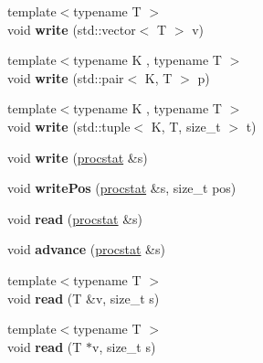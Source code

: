 \begin{DoxyCompactItemize}
{\footnotesize template$<$typename T $>$ }\\void {\bfseries write} (std\+::vector$<$ T $>$ v)
\item 
\hypertarget{classfaster_1_1fastCommBuffer_a0a3d8c055a7c060f5a16b03390fc4cf3}{}\label{classfaster_1_1fastCommBuffer_a0a3d8c055a7c060f5a16b03390fc4cf3} 
{\footnotesize template$<$typename K , typename T $>$ }\\void {\bfseries write} (std\+::pair$<$ K, T $>$ p)
\item 
\hypertarget{classfaster_1_1fastCommBuffer_ae09a68a8815aa1f7a24a5fab133c34ca}{}\label{classfaster_1_1fastCommBuffer_ae09a68a8815aa1f7a24a5fab133c34ca} 
{\footnotesize template$<$typename K , typename T $>$ }\\void {\bfseries write} (std\+::tuple$<$ K, T, size\+\_\+t $>$ t)
\item 
\hypertarget{classfaster_1_1fastCommBuffer_a96461d57713b8184137257c6e045c0a1}{}\label{classfaster_1_1fastCommBuffer_a96461d57713b8184137257c6e045c0a1} 
void {\bfseries write} (\hyperlink{classfaster_1_1procstat}{procstat} \&s)
\item 
\hypertarget{classfaster_1_1fastCommBuffer_a58ca907f93b412801d9cc956510a2356}{}\label{classfaster_1_1fastCommBuffer_a58ca907f93b412801d9cc956510a2356} 
void {\bfseries write\+Pos} (\hyperlink{classfaster_1_1procstat}{procstat} \&s, size\+\_\+t pos)
\item 
\hypertarget{classfaster_1_1fastCommBuffer_af7dc758c4e8a09aa4e7d31396075c72a}{}\label{classfaster_1_1fastCommBuffer_af7dc758c4e8a09aa4e7d31396075c72a} 
void {\bfseries read} (\hyperlink{classfaster_1_1procstat}{procstat} \&s)
\item 
\hypertarget{classfaster_1_1fastCommBuffer_a32d131a02dd0617af63568d0c1f1d34d}{}\label{classfaster_1_1fastCommBuffer_a32d131a02dd0617af63568d0c1f1d34d} 
void {\bfseries advance} (\hyperlink{classfaster_1_1procstat}{procstat} \&s)
\item 
\hypertarget{classfaster_1_1fastCommBuffer_add86f6104e056f605ac080438ddf58f4}{}\label{classfaster_1_1fastCommBuffer_add86f6104e056f605ac080438ddf58f4} 
{\footnotesize template$<$typename T $>$ }\\void {\bfseries read} (T \&v, size\+\_\+t s)
\item 
\hypertarget{classfaster_1_1fastCommBuffer_aad2acb51374cc1fac0bc46ee6810bc50}{}\label{classfaster_1_1fastCommBuffer_aad2acb51374cc1fac0bc46ee6810bc50} 
{\footnotesize template$<$typename T $>$ }\\void {\bfseries read} (T $\ast$v, size\+\_\+t s)

\end{DoxyCompactItemize}
